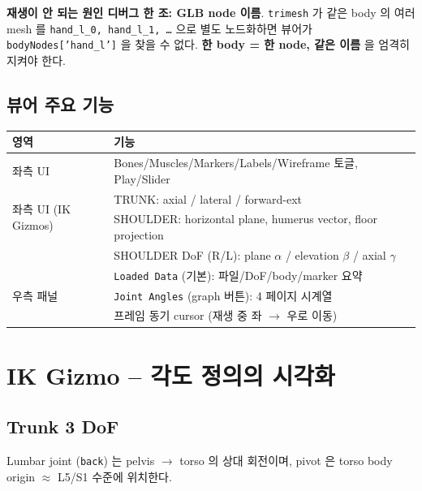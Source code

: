 \documentclass[11pt, a4paper]{report}
\begin{document}
\begin{warningbox}
\textbf{재생이 안 되는 원인 디버그 한 조: GLB node 이름}.
\texttt{trimesh} 가 같은 body 의 여러 mesh 를
\texttt{hand\_l\_0, hand\_l\_1, \dots} 으로 별도 노드화하면
뷰어가 \texttt{bodyNodes['hand\_l']} 을 찾을 수 없다.
\textbf{한 body = 한 node, 같은 이름} 을 엄격히 지켜야 한다.
\end{warningbox}

\section{뷰어 주요 기능}

\begin{center}
\begin{tabular}{l|l}
\toprule
\textbf{영역} & \textbf{기능} \\
\midrule
좌측 UI & Bones/Muscles/Markers/Labels/Wireframe 토글, Play/Slider \\
\midrule
\multirow{2}{*}{좌측 UI (IK Gizmos)} & TRUNK: axial / lateral / forward-ext \\
  & SHOULDER: horizontal plane, humerus vector, floor projection \\
  & SHOULDER DoF (R/L): plane $\alpha$ / elevation $\beta$ / axial $\gamma$ \\
\midrule
\multirow{3}{*}{우측 패널} & \texttt{Loaded Data} (기본): 파일/DoF/body/marker 요약 \\
  & \texttt{Joint Angles} (graph 버튼): 4 페이지 시계열 \\
  & 프레임 동기 cursor (재생 중 좌 $\to$ 우로 이동) \\
\bottomrule
\end{tabular}
\end{center}


\chapter{IK Gizmo -- 각도 정의의 시각화}

\section{Trunk 3 DoF}

Lumbar joint (\texttt{back}) 는 pelvis $\to$ torso 의 상대 회전이며,
pivot 은 torso body origin $\approx$ L5/S1 수준에 위치한다.
\end{document}

